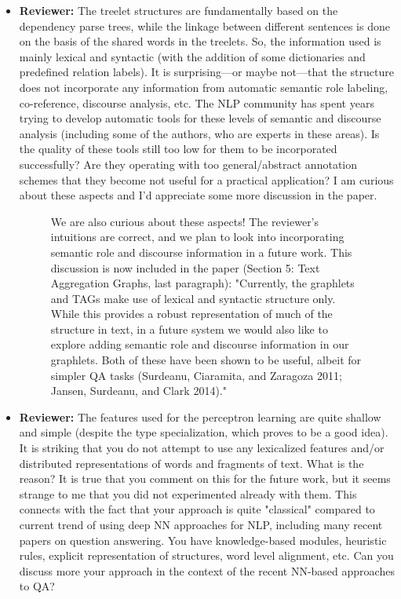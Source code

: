 \documentclass[10pt]{article}
\begin{document}
\begin{itemize}
\item \textbf{Reviewer:} The treelet structures are fundamentally based on the dependency parse
trees, while the linkage between different sentences is done on the basis of
the shared words in the treelets. So, the information used is mainly lexical
and syntactic (with the addition of some dictionaries and predefined
relation labels). It is surprising---or maybe not---that the structure does
not incorporate any information from automatic semantic role labeling,
co-reference, discourse analysis, etc. The NLP community has spent years
trying to develop automatic tools for these levels of semantic and discourse
analysis (including some of the authors, who are experts in these areas). Is
the quality of these tools still too low for them to be incorporated
successfully? Are they operating with too general/abstract annotation
schemes that they become not useful for a practical application? I am
curious about these aspects and I'd appreciate some more discussion in the
paper.

\begin{figure}[H]
\caption{We are also curious about these aspects! The reviewer's intuitions are correct, and we plan to look into incorporating semantic role and discourse information in a future work. This discussion is now included in the paper (Section 5: Text Aggregation Graphs, last paragraph):
"Currently, the graphlets and TAGs make use of lexical and syntactic structure only. While this provides a robust representation of much of the structure in text, in a future system we would also like to explore adding semantic role and discourse information in our graphlets. Both of these have been shown to be useful, albeit for simpler QA tasks (Surdeanu, Ciaramita, and Zaragoza 2011; Jansen, Surdeanu, and Clark 2014)."}
\end{figure}


\item \textbf{Reviewer:} The features used for the perceptron learning are quite shallow and simple
(despite the type specialization, which proves to be a good idea). It is
striking that you do not attempt to use any lexicalized features and/or
distributed representations of words and fragments of text. What is the
reason? It is true that you comment on this for the future work, but it
seems strange to me that you did not experimented already with them. This
connects with the fact that your approach is quite "classical" compared to
current trend of using deep NN approaches for NLP, including many recent
papers on question answering. You have knowledge-based modules, heuristic
rules, explicit representation of structures, word level alignment, etc. Can
you discuss more your approach in the context of the recent NN-based
approaches to QA?


\end{itemize}
\end{document}
